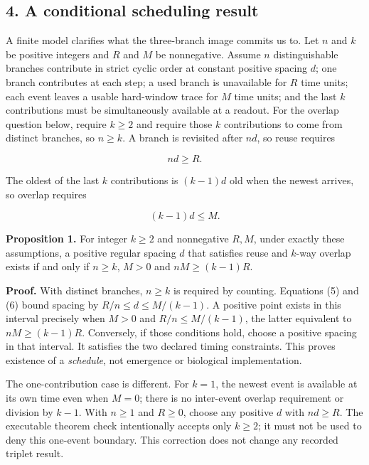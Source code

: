 \documentclass[
  american,
  11pt,
  letterpaper,
]{article}
\begin{document}
\subsection{4. A conditional scheduling result}\label{a-conditional-scheduling-result}

A finite model clarifies what the three-branch image commits us to. Let \(n\) and \(k\) be positive integers and \(R\) and \(M\) be nonnegative. Assume \(n\) distinguishable branches contribute in strict cyclic order at constant positive spacing \(d\); one branch contributes at each step; a used branch is unavailable for \(R\) time units; each event leaves a usable hard-window trace for \(M\) time units; and the last \(k\) contributions must be simultaneously available at a readout. For the overlap question below, require \(k\geq 2\) and require those \(k\) contributions to come from distinct branches, so \(n\geq k\). A branch is revisited after \(nd\), so reuse requires

\[
nd\geq R.
\tag{5}
\]

The oldest of the last \(k\) contributions is \((k-1)d\) old when the newest arrives, so overlap requires

\[
(k-1)d\leq M.
\tag{6}
\]

\textbf{Proposition 1.} For integer \(k\geq 2\) and nonnegative \(R,M\), under exactly these assumptions, a positive regular spacing \(d\) that satisfies reuse and \(k\)-way overlap exists if and only if \(n\geq k\), \(M>0\) and \(nM\geq(k-1)R\).

\textbf{Proof.} With distinct branches, \(n\geq k\) is required by counting. Equations (5) and (6) bound spacing by \(R/n\leq d\leq M/(k-1)\). A positive point exists in this interval precisely when \(M>0\) and \(R/n\leq M/(k-1)\), the latter equivalent to \(nM\geq(k-1)R\). Conversely, if those conditions hold, choose a positive spacing in that interval. It satisfies the two declared timing constraints. This proves existence of a \emph{schedule}, not emergence or biological implementation.

The one-contribution case is different. For \(k=1\), the newest event is available at its own time even when \(M=0\); there is no inter-event overlap requirement or division by \(k-1\). With \(n\geq1\) and \(R\geq0\), choose any positive \(d\) with \(nd\geq R\). The executable theorem check intentionally accepts only \(k\geq2\); it must not be used to deny this one-event boundary. This correction does not change any recorded triplet result.
\end{document}

